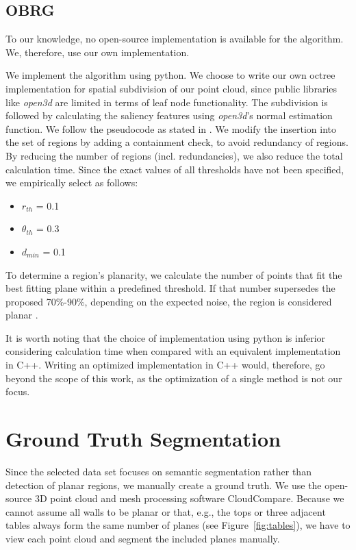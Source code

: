 \documentclass[main.tex]{subfiles}
\begin{document}
\subsection{OBRG}
To our knowledge, no open-source implementation is available for the algorithm.
We, therefore, use our own implementation.

We implement the algorithm using python. We choose to write our own octree implementation for spatial subdivision of our point cloud, since
public libraries like \textit{open3d} are limited in terms of leaf node functionality.
The subdivision is followed by calculating the saliency features using \textit{open3d}'s normal estimation function.
We follow the pseudocode as stated in \cite[Algorithm~1]{Vo_Truong-Hong_Laefer_Bertolotto_2015}. We modify the insertion into the set
of regions by adding a containment check, to avoid redundancy of regions. By reducing the number of regions (incl. redundancies), we also
reduce the total calculation time.
Since the exact values of all thresholds have not been specified, we empirically select as follows:

\begin{itemize}
    \item $r_{th}$ = 0.1 
    \item $\theta_{th}$ = 0.3
    \item $d_{min}$ =  0.1
\end{itemize}

To determine a region's planarity, we calculate the number of points that fit the best fitting plane within a predefined threshold. 
If that number supersedes the proposed 70\%-90\%, depending on the expected noise, the region is considered planar \cite[Section~3.4]{Vo_Truong-Hong_Laefer_Bertolotto_2015}.

It is worth noting that the choice of implementation using python is inferior considering calculation time when compared with an equivalent implementation in C++. Writing an optimized implementation in C++ would, therefore, go beyond the scope of this work, as the optimization of
a single method is not our focus. 

\section{Ground Truth Segmentation}

Since the selected data set focuses on semantic segmentation rather than detection of planar regions, we manually create a ground truth.
We use the open-source 3D point cloud and mesh processing software CloudCompare.
Because we cannot assume all walls to be planar or that, e.g., the tops or three adjacent tables always form the same number of planes (see Figure~\ref{fig:tables}), we 
have to view each point cloud and segment the included planes manually.
\end{document}
